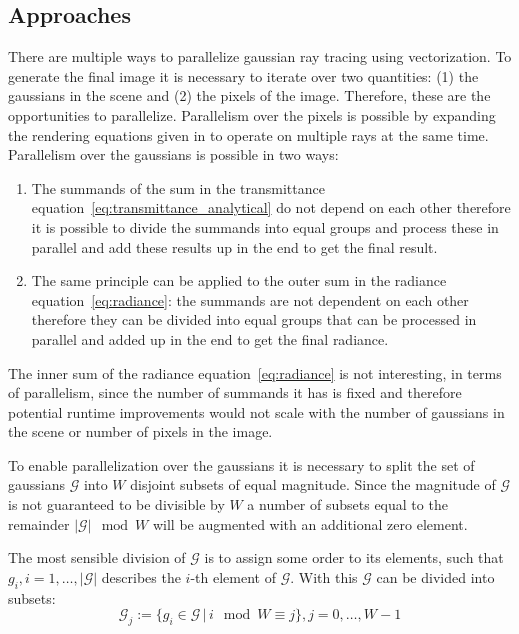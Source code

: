\documentclass[a4paper, 11pt]{memoir}
\begin{document}
    \subsection{Approaches}
    There are multiple ways to parallelize gaussian ray tracing using vectorization. To generate the final image it is necessary to iterate
    over two quantities: (1) the gaussians in the scene and (2) the pixels of the image. Therefore, these are the opportunities to parallelize.
    Parallelism over the pixels is possible by expanding the rendering equations given in \cite{Rhodin:2015} to operate on multiple rays at the
    same time. Parallelism over the gaussians is possible in two ways:
    \begin{enumerate}
        \item The summands of the sum in the \gls{transmittance} equation~\eqref{eq:transmittance_analytical} do not depend on each
            other therefore it is possible to divide the summands into equal groups and process these in parallel
            and add these results up in the end to get the final result.
        \item The same principle can be applied to the outer sum in the \gls{radiance} equation~\eqref{eq:radiance}: the summands are
            not dependent on each other therefore they can be divided into equal groups that can
            be processed in parallel and added up in the end to get the final \gls{radiance}.
    \end{enumerate}
    The inner sum of the \gls{radiance} equation~\eqref{eq:radiance} is not interesting, in terms of parallelism, since the number
    of summands it has is fixed and therefore potential runtime improvements would not scale with the number of gaussians in the scene or number
    of pixels in the image.

    To enable parallelization over the gaussians it is necessary to split the set of
    gaussians $\mathcal{G}$ into $W$ disjoint subsets of equal magnitude. Since the magnitude of $\mathcal{G}$ is not guaranteed to be divisible by $W$
    a number of subsets equal to the remainder $|\mathcal{G}| \mod W$ will be augmented with an additional zero element.

    The most sensible division of $\mathcal{G}$ is to assign some order to its elements, such that $g_i, i=1,\dots,|\mathcal{G}|$ describes the $i$-th element of
    $\mathcal{G}$. With this $\mathcal{G}$ can be divided into subsets:
    \begin{equation}
        \mathcal{G}_j := \{ g_i \in \mathcal{G} \,|\, i \mod W \equiv j \}, j=0,\dots,W-1
    \end{equation}
\end{document}
